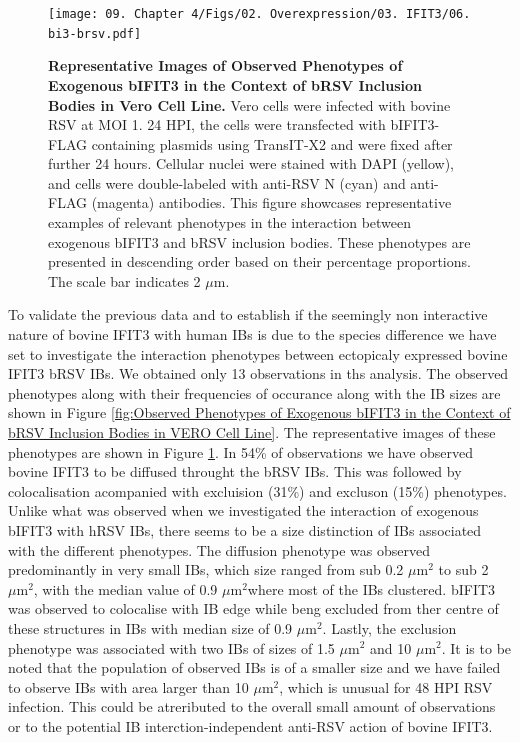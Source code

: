 \begin{figure}
    \centering
    \texttt{[image: 09. Chapter 4/Figs/02. Overexpression/03. IFIT3/06. bi3-brsv.pdf]}
    \caption[Representative Images of Observed Phenotypes of Exogenous bIFIT3 in the Context of bRSV Inclusion Bodies in Vero Cell Line.]{\textbf{Representative Images of Observed Phenotypes of Exogenous bIFIT3 in the Context of bRSV Inclusion Bodies in Vero Cell Line.} Vero cells were infected with bovine RSV at MOI 1. 24 HPI, the cells were transfected with bIFIT3-FLAG containing plasmids using TransIT-X2 and were fixed after further 24 hours. Cellular nuclei were stained with DAPI (yellow), and cells were double-labeled with anti-RSV N (cyan) and anti-FLAG (magenta) antibodies. This figure showcases representative examples of relevant phenotypes in the interaction between exogenous bIFIT3 and bRSV inclusion bodies. These phenotypes are presented in descending order based on their percentage proportions. The scale bar indicates 2 \(\mu \mbox{m}\).}
    \label{fig:Representative Images of Observed Phenotypes of Exogenous bIFIT3 in the Context of bRSV Inclusion Bodies in VERO Cell Line}
\end{figure}

To validate the previous data and to establish if the seemingly non interactive nature of bovine IFIT3 with human IBs is due to the species difference we have set to investigate the interaction phenotypes between ectopicaly expressed bovine IFIT3 bRSV IBs. We obtained only 13 observations in ths analysis. The observed phenotypes along with their frequencies of occurance along with the IB sizes are shown in Figure \ref{fig:Observed Phenotypes of Exogenous bIFIT3 in the Context of bRSV Inclusion Bodies in VERO Cell Line}. The representative images of these phenotypes are shown in Figure \ref{fig:Representative Images of Observed Phenotypes of Exogenous bIFIT3 in the Context of bRSV Inclusion Bodies in VERO Cell Line}. In 54\% of observations we have observed bovine IFIT3 to be diffused throught the bRSV IBs. This was followed by colocalisation acompanied with excluision (31\%) and excluson (15\%) phenotypes. Unlike what was observed when we investigated the interaction of exogenous bIFIT3 with hRSV IBs, there seems to be a size distinction of IBs associated with the different phenotypes. The diffusion phenotype was observed predominantly in very small IBs, which size ranged from sub 0.2 \(\mu \mbox{m}^2\) to sub 2 \(\mu \mbox{m}^2\), with the median value of 0.9 \(\mu \mbox{m}^2\)where most of the IBs clustered. bIFIT3 was observed to colocalise with IB edge while beng excluded from ther centre of these structures in IBs with median size of 0.9 \(\mu \mbox{m}^2\). Lastly, the exclusion phenotype was associated with two IBs of sizes of 1.5 \(\mu \mbox{m}^2\) and 10 \(\mu \mbox{m}^2\). It is to be noted that the population of observed IBs is of a smaller size and we have failed to observe IBs with area larger than 10 \(\mu \mbox{m}^2\), which is unusual for 48 HPI RSV infection. This could be atreributed to the overall small amount of observations or to the potential IB interction-independent anti-RSV action of bovine IFIT3.


